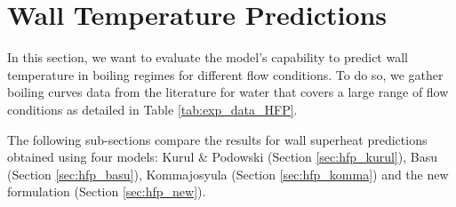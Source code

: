 \clearpage

\section{Wall Temperature Predictions}
\label{sec:hfp_valid_DTw}

In this section, we want to evaluate the model's capability to predict wall temperature in boiling regimes for different flow conditions. To do so, we gather boiling curves data from the literature for water that covers a large range of flow conditions as detailed in Table \ref{tab:exp_data_HFP}.


\begin{table}[h!]


\noindent{}
\caption{Experimental data range of wall temperature measurements in the boiling region.}
\label{tab:exp_data_HFP}
\end{table}

\npar


The following sub-sections compare the results for wall superheat predictions obtained using four models: Kurul \& Podowski (Section \ref{sec:hfp_kurul}), Basu \etal (Section \ref{sec:hfp_basu}), Kommajosyula (Section \ref{sec:hfp_komma}) and the new formulation (Section \ref{sec:hfp_new}).

